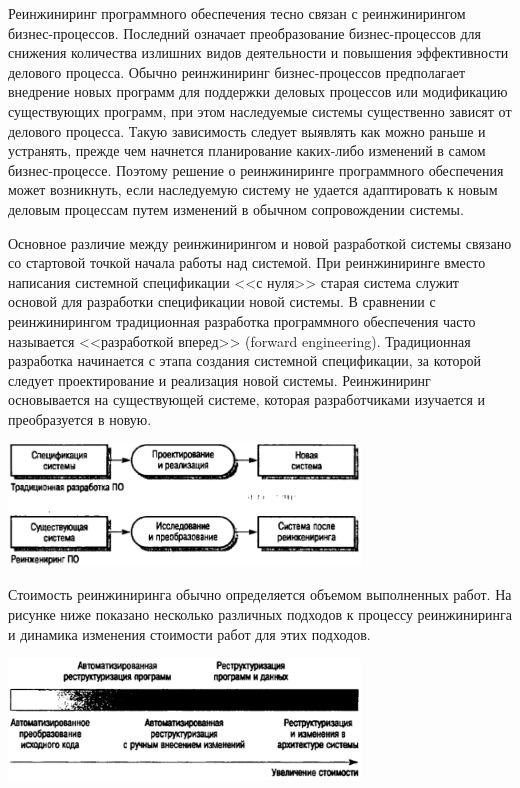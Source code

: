 \documentclass{../../text-style}
\begin{document}
Реинжиниринг программного обеспечения тесно связан с реинжинирингом бизнес-процессов. Последний означает преобразование бизнес-процессов для снижения количества излишних видов деятельности и повышения эффективности делового процесса. Обычно реинжиниринг бизнес-процессов предполагает внедрение новых программ для поддержки деловых процессов или модификацию существующих программ, при этом наследуемые системы существенно зависят от делового процесса. Такую зависимость следует выявлять как можно раньше и устранять, прежде чем начнется планирование каких-либо изменений в самом бизнес-процессе. Поэтому решение о реинжиниринге программного обеспечения может возникнуть, если наследуемую систему не удается адаптировать к новым деловым процессам путем изменений в обычном сопровождении системы.

Основное различие между реинжинирингом и новой разработкой системы связано со стартовой точкой начала работы над системой. При реинжиниринге вместо написания системной спецификации <<с нуля>> старая система служит основой для разработки спецификации новой системы. В сравнении с реинжинирингом традиционная разработка программного обеспечения часто называется <<разработкой вперед>> (forward engineering). Традиционная разработка начинается с этапа создания системной спецификации, за которой следует проектирование и реализация новой системы. Реинжиниринг основывается на существующей системе, которая разработчиками изучается и преобразуется в новую.

\begin{center}
    \includegraphics[width=0.7\textwidth]{developmentVsReengineering.png}
\end{center}

Стоимость реинжиниринга обычно определяется объемом выполненных работ. На рисунке ниже показано несколько различных подходов к процессу реинжиниринга и динамика изменения стоимости работ для этих подходов.

\begin{center}
    \includegraphics[width=0.7\textwidth]{reengineeringAutomation.png}
\end{center}
\end{document}
